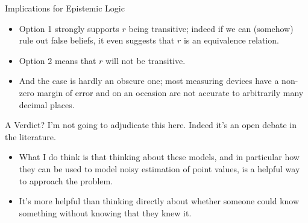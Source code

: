 \documentclass[
  14pt,
  letterpaper,
  ignorenonframetext,
]{beamer}
\providecommand{\tightlist}{%
  \setlength{\itemsep}{0pt}\setlength{\parskip}{0pt}}\usepackage{longtable,booktabs,array}
\begin{document}
\begin{frame}{Implications for Epistemic Logic}
\protect\hypertarget{implications-for-epistemic-logic}{}
\begin{itemize}
\tightlist
\item
  Option 1 strongly supports \(r\) being transitive; indeed if we can
  (somehow) rule out false beliefs, it even suggests that \(r\) is an
  equivalence relation.
\item
  Option 2 means that \(r\) will not be transitive.
\item
  And the case is hardly an obscure one; most measuring devices have a
  non-zero margin of error and on an occasion are not accurate to
  arbitrarily many decimal places.
\end{itemize}
\end{frame}

\begin{frame}{A Verdict?}
\protect\hypertarget{a-verdict}{}
I'm not going to adjudicate this here. Indeed it's an open debate in the
literature.

\begin{itemize}
\tightlist
\item
  What I do think is that thinking about these models, and in particular
  how they can be used to model noisy estimation of point values, is a
  helpful way to approach the problem.
\item
  It's more helpful than thinking directly about whether someone could
  know something without knowing that they knew it.
\end{itemize}
\end{frame}
\end{document}
